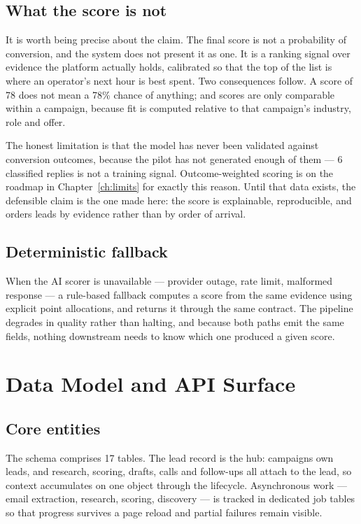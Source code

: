 \documentclass[11pt,a4paper]{report}
\begin{document}
\section{What the score is not}
It is worth being precise about the claim. The final score is not a probability of conversion, and the system does not present it as one. It is a ranking signal over evidence the platform actually holds, calibrated so that the top of the list is where an operator's next hour is best spent. Two consequences follow. A score of 78 does not mean a 78\% chance of anything; and scores are only comparable within a campaign, because fit is computed relative to that campaign's industry, role and offer.

The honest limitation is that the model has never been validated against conversion outcomes, because the pilot has not generated enough of them --- 6 classified replies is not a training signal. Outcome-weighted scoring is on the roadmap in Chapter~\ref{ch:limits} for exactly this reason. Until that data exists, the defensible claim is the one made here: the score is explainable, reproducible, and orders leads by evidence rather than by order of arrival.

\section{Deterministic fallback}
When the AI scorer is unavailable --- provider outage, rate limit, malformed response --- a rule-based fallback computes a score from the same evidence using explicit point allocations, and returns it through the same contract. The pipeline degrades in quality rather than halting, and because both paths emit the same fields, nothing downstream needs to know which one produced a given score.

\chapter{Data Model and API Surface}
\section{Core entities}
The schema comprises 17 tables. The lead record is the hub: campaigns own leads, and research, scoring, drafts, calls and follow-ups all attach to the lead, so context accumulates on one object through the lifecycle. Asynchronous work --- email extraction, research, scoring, discovery --- is tracked in dedicated job tables so that progress survives a page reload and partial failures remain visible.
\end{document}
